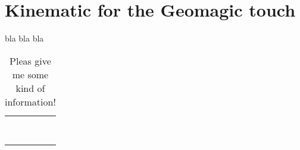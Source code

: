 \chapter{Kinematic for the Geomagic touch} %

bla bla bla

\begin{table}[h!]
\centering
\label{my-label}
\begin{tabular}{|l|l|l|l|l|}
\hline
 &  &  &  &  \\ \hline
 &  &  &  &  \\ \hline
 &  &  &  &  \\ \hline
 &  &  &  &  \\ \hline
 &  &  &  &  \\ \hline
 &  &  &  &  \\ \hline
 &  &  &  &  \\ \hline
 &  &  &  &  \\ \hline
 &  &  &  &  \\ \hline
\end{tabular}
\caption{Pleas give me some kind of information!}
\end{table}


